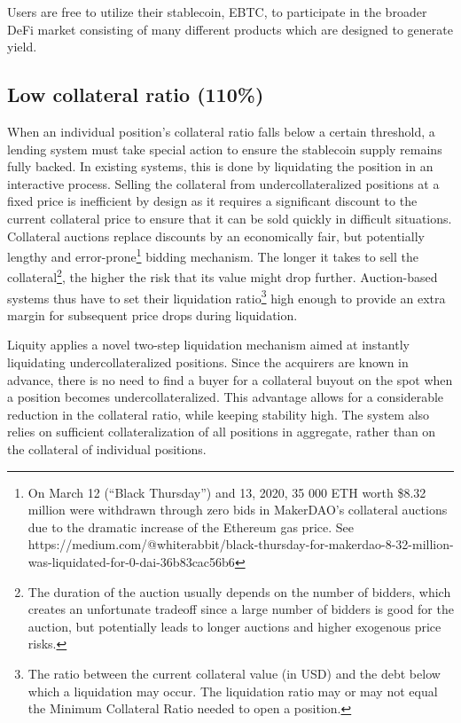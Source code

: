 \documentclass{article}
\begin{document}
Users are free to utilize their stablecoin, EBTC, to participate in the broader DeFi market consisting of many different products which are designed to generate yield.

\subsection{Low collateral ratio (110\%)}
When an individual position’s collateral ratio falls below a certain threshold, a lending system must take special action to ensure the stablecoin supply remains fully backed. In existing systems, this is done by liquidating the position in an interactive process. Selling the collateral from undercollateralized positions at a fixed price is inefficient by design as it requires a significant discount to the current collateral price to ensure that it can be sold quickly in difficult situations. Collateral auctions replace discounts by an economically fair, but potentially lengthy and error-prone\footnote{On March 12 (“Black Thursday”) and 13, 2020, 35 000 ETH worth \$8.32 million were withdrawn through zero bids in MakerDAO’s collateral auctions due to the dramatic increase of the Ethereum gas price. See https://medium.com/@whiterabbit/black-thursday-for-makerdao-8-32-million-was-liquidated-for-0-dai-36b83cac56b6} bidding mechanism. The longer it takes to sell the collateral\footnote{The duration of the auction usually depends on the number of bidders, which creates an unfortunate tradeoff since a large number of bidders is good for the auction, but potentially leads to longer auctions and higher exogenous price risks.}, the higher the risk that its value might drop further. Auction-based systems thus have to set their liquidation ratio\footnote{The ratio between the current collateral value (in USD) and the debt below which a liquidation may occur. The liquidation ratio may or may not equal the Minimum Collateral Ratio needed to open a position.} high enough to provide an extra margin for subsequent price drops during liquidation.

Liquity applies a novel two-step liquidation mechanism aimed at instantly liquidating undercollateralized positions. Since the acquirers are known in advance, there is no need to find a buyer for a collateral buyout on the spot when a position becomes undercollateralized. This advantage allows for a considerable reduction in the collateral ratio, while keeping stability high. The system also relies on sufficient collateralization of all positions in aggregate, rather than on the collateral of individual positions.
\end{document}
